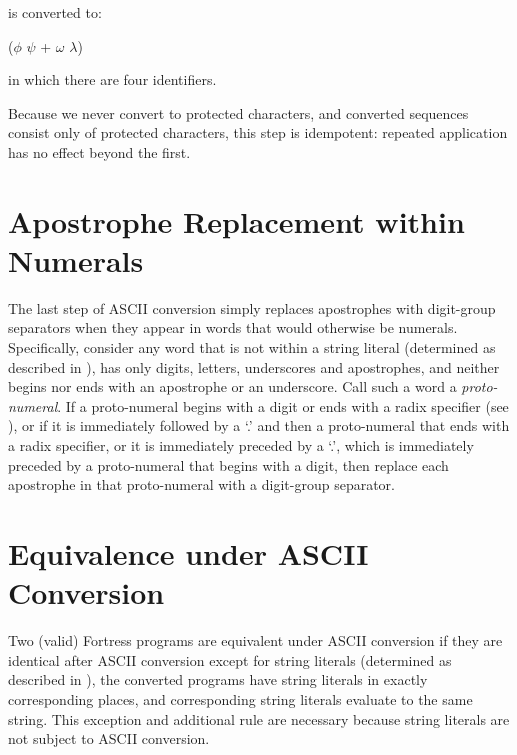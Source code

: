 is converted to:

\begin{ttt}
($\phi$ $\psi$ +
$\omega$ $\lambda$)
\end{ttt}

in which there are four identifiers.

Because we never convert to protected characters,
and converted sequences consist only of protected characters,
this step is idempotent:
repeated application has no effect beyond the first.


\section{Apostrophe Replacement within Numerals}

The last step of ASCII conversion simply replaces
apostrophes with digit-group separators
when they appear in words that would otherwise be numerals.
Specifically,
consider any word that is not within a string literal
(determined as described in ),
has only digits, letters, underscores
and apostrophes,
and neither begins nor ends with an apostrophe or an underscore.
Call such a word a \emph{proto-numeral}.
If a proto-numeral begins with a digit
or ends with a radix specifier
(see ),
or if it is immediately followed by a `.'
and then a proto-numeral that ends with a radix specifier,
or it is immediately preceded by a `.',
which is immediately preceded by a proto-numeral
that begins with a digit,
then replace each apostrophe in that proto-numeral
with a digit-group separator.

\section{Equivalence under ASCII Conversion}

Two (valid) Fortress programs are equivalent under ASCII conversion
if they are identical after ASCII conversion
except for string literals
(determined as described in ),
the converted programs have string literals
in exactly corresponding places,
and corresponding string literals evaluate to the same string.
This exception and additional rule
are necessary because string literals
are not subject to ASCII conversion.
